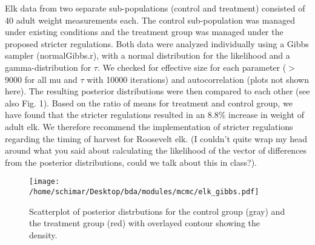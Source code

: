 \documentclass[letterpaper, 12pt]{article}
\begin{document}
\noindent Elk data from two separate sub-populations (control and treatment) consisted of 40 adult weight measurements each. The control sub-population was managed under existing conditions and the treatment group was managed under the proposed stricter regulations. Both data were analyzed individually using a Gibbs sampler (normalGibbs.r), with a normal distribution for the likelihood and a gamma-distribution for $\tau $. We checked for effective size for each parameter ($>$ 9000 for all mu and $\tau$ with 10000 iterations) and autocorrelation (plots not shown here). The resulting posterior distributions were then compared to each other (see also Fig. 1). Based on the ratio of means for treatment and control group, we have found that the stricter regulations resulted in an 8.8\% increase in weight of adult elk. We therefore recommend the implementation of stricter regulations regarding the timing of harvest for Roosevelt elk. (I couldn't quite wrap my head around what you said about calculating the likelihood of the vector of differences from the posterior distributions, could we talk about this in class?). \\






\begin{figure}[h!]\centering
	\texttt{[image: /home/schimar/Desktop/bda/modules/mcmc/elk\_gibbs.pdf]}
	\caption{Scatterplot of posterior distrbutions for the control group (gray) and the treatment group (red) with overlayed contour showing the density.}
\end{figure}









\end{document}
